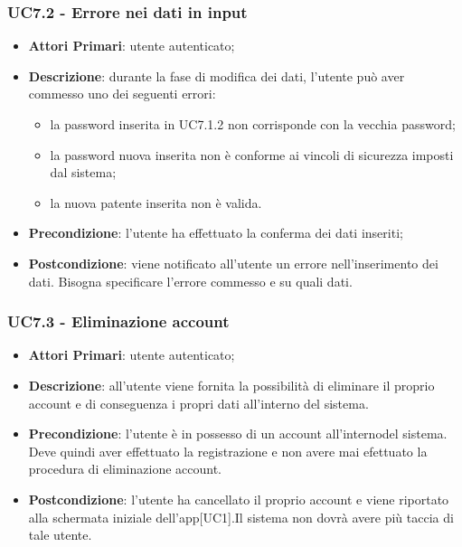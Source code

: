 \subsubsection{UC7.2 - Errore nei dati in input}
\begin{itemize}
	\item \textbf{Attori Primari}: utente autenticato;
	\item \textbf{Descrizione}: durante la fase di modifica dei dati, l'utente può aver commesso uno dei seguenti errori:
	\begin{itemize}[label=$-$]
	\item la password inserita in UC7.1.2 non corrisponde con la vecchia password;
	\item la password nuova inserita non è conforme ai vincoli di sicurezza imposti dal sistema;
	\item la nuova patente inserita non è valida.	
	\end{itemize}
	\item \textbf{Precondizione}: l'utente ha effettuato la conferma dei dati inseriti;
	\item \textbf{Postcondizione}: viene notificato all'utente un errore nell'inserimento dei dati. Bisogna specificare l'errore commesso e su quali dati.
\end{itemize}

\subsubsection{UC7.3 - Eliminazione account}
\begin{itemize}
	\item \textbf{Attori Primari}: utente autenticato;
	\item \textbf{Descrizione}: all'utente viene fornita la possibilità di eliminare il proprio account e di conseguenza i propri dati all'interno del sistema.
	\item \textbf{Precondizione}: l'utente è in possesso di un account all'internodel sistema. Deve quindi aver effettuato la registrazione e non avere mai efettuato la procedura di eliminazione account.
	\item \textbf{Postcondizione}: l'utente ha cancellato il proprio account e viene riportato alla schermata iniziale dell'app[UC1].Il sistema non dovrà avere più taccia di tale utente.
\end{itemize}







